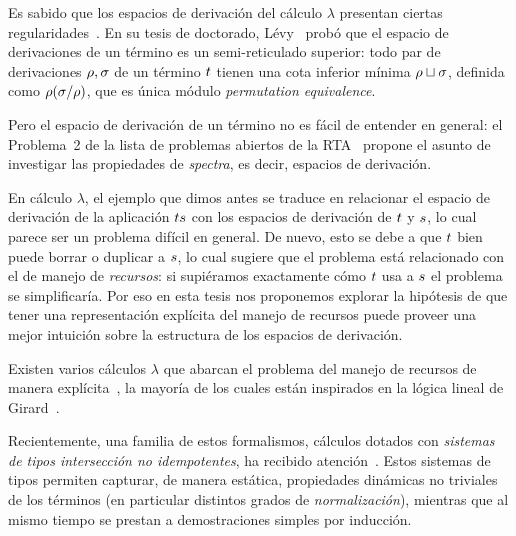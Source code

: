 Es sabido que los espacios de derivación del cálculo $\lambda$ presentan
ciertas regularidades~\cite{Tesis:Levy:1978,DBLP:journals/tcs/Zilli84,laneve1994distributive,thesismellies,levy_redex_stability,DBLP:conf/lics/AspertiL13}.
En su tesis de doctorado, L\'evy~\cite{Tesis:Levy:1978}
probó que el espacio de derivaciones de un término es un semi-reticulado superior: todo par de derivaciones
$\rho,\sigma$ de un término $t$
tienen una cota inferior mínima $\rho \sqcup \sigma$, definida como $\rho(\sigma/\rho)$,
que es única módulo \textit{permutation equivalence}.

Pero el espacio de derivación de un término no es fácil de entender en general: el Problema~2 de la
lista de problemas abiertos de la RTA~\cite{dershowitz1991open}
propone el asunto de investigar las propiedades de \textit{spectra}, es decir, espacios de derivación.

En cálculo $\lambda$, el ejemplo que dimos antes se traduce en
relacionar el espacio de derivación de la aplicación $t s$
con los espacios de derivación de $t$ y $s$, lo cual parece ser un problema difícil en general.
De nuevo, esto se debe a que $t$ bien puede borrar o duplicar a $s$,
lo cual sugiere que el problema está relacionado con el de manejo de \textit{recursos}:
si supiéramos exactamente cómo $t$ usa a $s$ el problema se simplificaría.
Por eso en esta tesis nos proponemos explorar la hipótesis de que tener una representación
explícita del manejo de recursos puede proveer una mejor intuición
sobre la estructura de los espacios de derivación.

Existen varios cálculos $\lambda$ que abarcan el problema del manejo de recursos
de manera explícita~\cite{boudol1993lambda,ehrhard2003differential,kesner2007resource,kesner2009prismoid},
la mayoría de los cuales están inspirados en la lógica lineal de Girard~\cite{girard1987linear}.

Recientemente, una familia de estos formalismos, cálculos dotados con
\textit{sistemas de tipos intersección no idempotentes},
ha recibido atención~\cite{ehrhard2012collapsing,bernadet2013non,bucciarelli2014inhabitation,bucciarelli2017non,kesner2016reasoning,thesisvial,KRV18}.
Estos sistemas de tipos permiten capturar, de manera estática, propiedades dinámicas no triviales de los términos
(en particular distintos grados de \textit{normalización}), mientras que al mismo tiempo se prestan a
demostraciones simples por inducción.

